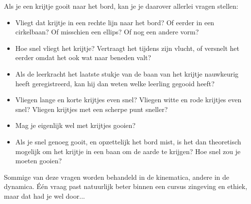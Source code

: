 \documentclass{ximera}
\begin{document}
\begin{example}
Als je een krijtje gooit naar het bord, kan je je daarover allerlei vragen stellen:
\begin{itemize}
\item Vliegt dat krijtje in een rechte lijn naar het bord? Of eerder in een cirkelbaan? Of misschien een ellips? Of nog een andere vorm? 
\item Hoe snel vliegt het krijtje? Vertraagt het tijdens zijn vlucht, of versnelt het eerder omdat het ook wat naar beneden valt? 
\item Als de leerkracht het laatste stukje van de baan van het krijtje nauwkeurig heeft geregistreerd, kan hij dan weten welke leerling gegooid heeft?
\item Vliegen lange en korte krijtjes even snel? Vliegen witte en rode krijtjes even snel? Vliegen krijtjes met een scherpe punt sneller?
\item Mag je eigenlijk wel met krijtjes gooien?
\item Als je snel genoeg gooit, en opzettelijk het bord mist, is het dan theoretisch mogelijk om het krijtje in een baan om de aarde te krijgen? Hoe snel zou je moeten gooien? 
\end{itemize}  

Sommige van deze vragen worden behandeld in de kinematica, andere in de dynamica. 
Één vraag past natuurlijk beter binnen een cursus zingeving en ethiek, maar dat had je wel door... 
\end{example} \nl
\end{document}
